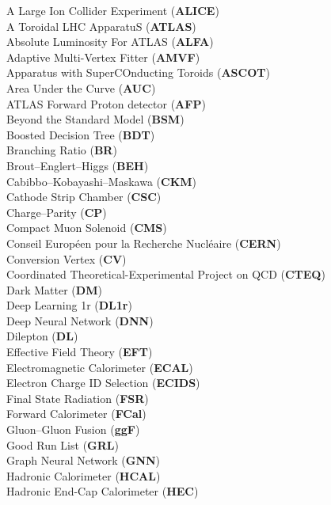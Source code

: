 A Large Ion Collider Experiment (\textbf{ALICE}) \\
A Toroidal LHC ApparatuS (\textbf{ATLAS}) \\
Absolute Luminosity For ATLAS (\textbf{ALFA}) \\
Adaptive Multi-Vertex Fitter (\textbf{AMVF}) \\
Apparatus with SuperCOnducting Toroids (\textbf{ASCOT}) \\
Area Under the Curve (\textbf{AUC}) \\
ATLAS Forward Proton detector (\textbf{AFP}) \\
Beyond the Standard Model (\textbf{BSM}) \\
Boosted Decision Tree (\textbf{BDT}) \\
Branching Ratio (\textbf{BR}) \\
Brout–Englert–Higgs (\textbf{BEH}) \\
Cabibbo–Kobayashi–Maskawa (\textbf{CKM}) \\
Cathode Strip Chamber (\textbf{CSC}) \\
Charge–Parity (\textbf{CP}) \\
Compact Muon Solenoid (\textbf{CMS}) \\
Conseil Européen pour la Recherche Nucléaire (\textbf{CERN}) \\
Conversion Vertex (\textbf{CV}) \\
Coordinated Theoretical-Experimental Project on QCD (\textbf{CTEQ}) \\
Dark Matter (\textbf{DM}) \\
Deep Learning 1r (\textbf{DL1r}) \\
Deep Neural Network (\textbf{DNN}) \\
Dilepton (\textbf{DL}) \\
Effective Field Theory (\textbf{EFT}) \\
Electromagnetic Calorimeter (\textbf{ECAL}) \\
Electron Charge ID Selection (\textbf{ECIDS}) \\
Final State Radiation (\textbf{FSR}) \\
Forward Calorimeter (\textbf{FCal}) \\
Gluon–Gluon Fusion (\textbf{ggF}) \\
Good Run List (\textbf{GRL}) \\
Graph Neural Network (\textbf{GNN}) \\
Hadronic Calorimeter (\textbf{HCAL}) \\
Hadronic End-Cap Calorimeter (\textbf{HEC}) \\
